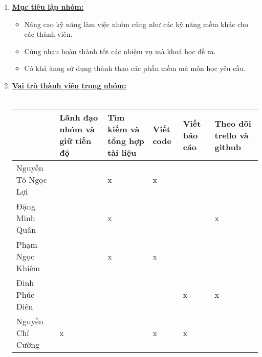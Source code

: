 \documentclass[12pt]{article}
\begin{document}
\begin{enumerate}
		\item \textbf{\uline{Mục tiêu lập nhóm:}}
		\begin{itemize}
			\item Nâng cao kỹ năng làm việc nhóm cũng như các kỹ năng mềm khác cho các thành viên.
			
			\item Cùng nhau hoàn thành tốt các nhiệm vụ mà khoá học đề ra.
			
			\item Có khả ănng sử dụng thành thạo các phần mềm mà môn học yêu cầu.
			\vspace{1\baselineskip}
		\end{itemize}
		\pagebreak
		\item \textbf{\uline{Vai trò thành viên trong nhóm:}}\\\\
		\begin{tabular}{|>{\centering\arraybackslash}p{4cm}|>{\centering\arraybackslash}p{1.7cm}|>{\centering\arraybackslash}p{1.7cm}|>{\centering\arraybackslash}p{1.7cm}|>{\centering\arraybackslash}p{1.7cm}|>{\centering\arraybackslash}p{1.7cm}|}
			\hline
			& Lãnh đạo nhóm và giữ tiến độ & Tìm kiếm và tổng hợp tài liệu & Viết code & Viết báo cáo & Theo dõi trello và github \\
			\hline
			Nguyễn Tô Ngọc Lợi &  & x & x &  &  \\
			\hline
			Đặng Minh Quân &  & x &  &  & x \\
			\hline
			Phạm Ngọc Khiêm &  & x & x &  &  \\
			\hline
			Đinh Phúc Diên &  &  &  & x & x \\
			\hline
			Nguyễn Chí Cường & x &  & x & x &  \\
			\hline
		\end{tabular}
	

\end{enumerate}
\end{document}
